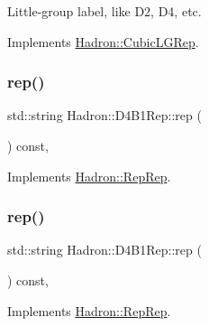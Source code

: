 Little-\/group label, like D2, D4, etc. 

Implements \mbox{\hyperlink{structHadron_1_1CubicLGRep_a9bdb14b519a611d21379ed96a3a9eb41}{Hadron\+::\+Cubic\+L\+G\+Rep}}.

\mbox{\label{structHadron_1_1D4B1Rep_a516f90b12897aaf51c240310d9183687}} 
\subsubsection{\texorpdfstring{rep()}{rep()}\hspace{0.1cm}{\footnotesize\ttfamily [1/5]}}
{\footnotesize\ttfamily std\+::string Hadron\+::\+D4\+B1\+Rep\+::rep (\begin{DoxyParamCaption}{ }\end{DoxyParamCaption}) const\hspace{0.3cm}{\ttfamily [inline]}, {\ttfamily [virtual]}}



Implements \mbox{\hyperlink{structHadron_1_1RepRep_ab3213025f6de249f7095892109575fde}{Hadron\+::\+Rep\+Rep}}.

\mbox{\label{structHadron_1_1D4B1Rep_a516f90b12897aaf51c240310d9183687}} 
\subsubsection{\texorpdfstring{rep()}{rep()}\hspace{0.1cm}{\footnotesize\ttfamily [2/5]}}
{\footnotesize\ttfamily std\+::string Hadron\+::\+D4\+B1\+Rep\+::rep (\begin{DoxyParamCaption}{ }\end{DoxyParamCaption}) const\hspace{0.3cm}{\ttfamily [inline]}, {\ttfamily [virtual]}}



Implements \mbox{\hyperlink{structHadron_1_1RepRep_ab3213025f6de249f7095892109575fde}{Hadron\+::\+Rep\+Rep}}.

\mbox{\label{structHadron_1_1D4B1Rep_a516f90b12897aaf51c240310d9183687}} 
